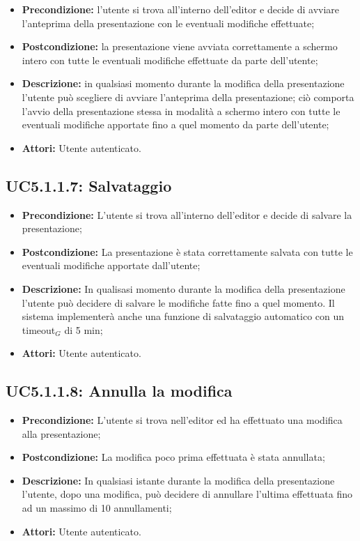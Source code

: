 \begin{itemize}
	\item \textbf{Precondizione:} l’utente si trova all’interno dell’editor e decide di avviare l’anteprima della presentazione con le eventuali modifiche effettuate;
	\item \textbf{Postcondizione:} la presentazione viene avviata correttamente a schermo intero con tutte le eventuali modifiche effettuate da parte dell’utente;
	\item \textbf{Descrizione:} in qualsiasi momento durante la modifica della presentazione l’utente può scegliere di avviare l’anteprima della presentazione; ciò comporta l’avvio della presentazione stessa in modalità a schermo intero con tutte le eventuali modifiche apportate fino a quel momento da parte dell’utente;
	\item \textbf{Attori:} Utente autenticato.
\end{itemize}
\subsection{ UC5.1.1.7: Salvataggio}

\begin{itemize}
	\item \textbf{Precondizione:} L’utente si trova all’interno dell’editor e decide di salvare la presentazione;
	\item \textbf{Postcondizione:} La presentazione è stata correttamente salvata con tutte le eventuali modifiche apportate dall’utente;
	\item \textbf{Descrizione:} In qualisasi momento durante la modifica della presentazione l’utente può decidere di salvare le modifiche fatte fino a quel momento. Il sistema implementerà anche una funzione di salvataggio automatico con un timeout$_G$ di 5 min;
	\item \textbf{Attori:} Utente autenticato.
\end{itemize}
\subsection{ UC5.1.1.8: Annulla la modifica}

\begin{itemize}
	\item \textbf{Precondizione:} L’utente si trova nell’editor ed ha effettuato una modifica alla presentazione;
	\item \textbf{Postcondizione:} La modifica poco prima effettuata è stata annullata;
	\item \textbf{Descrizione:} In qualsiasi istante durante la modifica della presentazione l’utente, dopo una modifica, può decidere di annullare l’ultima effettuata fino ad un massimo di 10 annullamenti;
	\item \textbf{Attori:} Utente autenticato.
\end{itemize}

